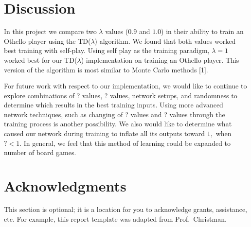 \documentclass{sig-alternate-05-2015}
\begin{document}
\section{Discussion}

In this project we compare two  $\lambda$ values ($0.9$ and $1.0$) in their ability to train an Othello player using the TD($\lambda$) algorithm. We found that both values worked best training with self-play. Using self play as the training paradigm, $\lambda  = 1$ worked best for our TD($\lambda$) implementation on training an Othello player. This version of the algorithm is most similar to Monte Carlo methods [1].

For future work with respect to our implementation, we would like to continue to explore combinations of ? values, ? values, network setups, and randomness to determine which results in the best training inputs. Using more advanced network techniques, such as changing of ? values and ? values through the training process is another possibility. We also would like to determine what caused our network during training to inflate all its outputs toward $1,$ when $? < 1$. In general, we feel that this method of learning could be expanded to number of board games.


\section{Acknowledgments}

This section is optional; it is a location for you to acknowledge grants,
assistance, etc. For example, this report template was adapted from Prof.~Christman.


\end{document}

